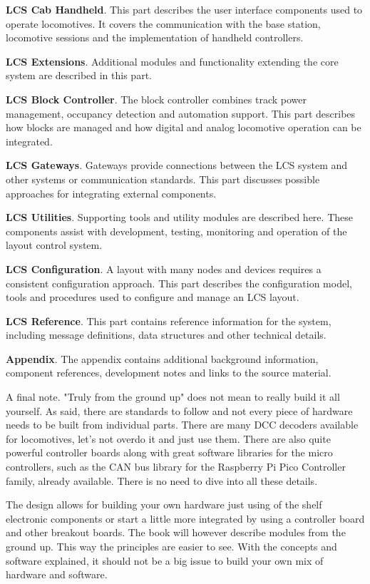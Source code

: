 \textbf{LCS Cab Handheld}. This part describes the user interface components used to operate locomotives. It covers the communication with the base station, locomotive sessions and the implementation of handheld controllers.

\textbf{LCS Extensions}. Additional modules and functionality extending the core system are described in this part.

\textbf{LCS Block Controller}. The block controller combines track power management, occupancy detection and automation support. This part describes how blocks are managed and how digital and analog locomotive operation can be integrated.

\textbf{LCS Gateways}. Gateways provide connections between the LCS system and other systems or communication standards. This part discusses possible approaches for integrating external components.

\textbf{LCS Utilities}. Supporting tools and utility modules are described here. These components assist with development, testing, monitoring and operation of the layout control system.

\textbf{LCS Configuration}. A layout with many nodes and devices requires a consistent configuration approach. This part describes the configuration model, tools and procedures used to configure and manage an LCS layout.

\textbf{LCS Reference}. This part contains reference information for the system, including message definitions, data structures and other technical details.

\textbf{Appendix}. The appendix contains additional background information, component references, development notes and links to the source material.



A final note. "Truly from the ground up" does not mean to really build it all yourself. As said, there are standards to follow and not every piece of hardware needs to be built from individual parts. There are many DCC decoders available for locomotives, let's not overdo it and just use them. There are also quite powerful controller boards along with great software libraries for the micro controllers, such as the CAN bus library for the Raspberry Pi Pico Controller family, already available. There is no need to dive into all these details.

The design allows for building your own hardware just using of the shelf electronic components or start a little more integrated by using a controller board and other breakout boards. The book will however describe modules from the ground up. This way the principles are easier to see. With the concepts and software explained, it should not be a big issue to build your own mix of hardware and software.

